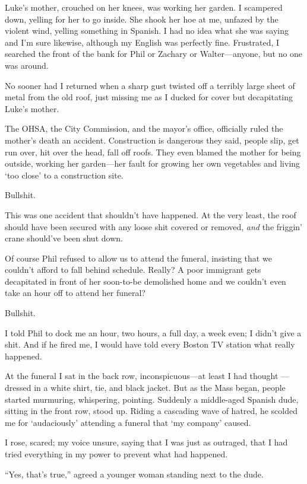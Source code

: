 Luke's mother, crouched on her knees, was working her garden. I
scampered down, yelling for her to go inside. She shook her hoe at me,
unfazed by the violent wind, yelling something in Spanish. I had no idea
what she was saying and I'm sure likewise, although my English was
perfectly fine. Frustrated, I searched the front of the bank for Phil or
Zachary or Walter---anyone, but no one was around.

No sooner had I returned when a sharp gust twisted off a terribly large
sheet of metal from the old roof, just missing me as I ducked for cover
but decapitating Luke's mother.

The OHSA, the City Commission, and the mayor's office, officially ruled
the mother's death an accident. Construction is dangerous they said,
people slip, get run over, hit over the head, fall off roofs. They even
blamed the mother for being outside, working her garden---her fault for
growing her own vegetables and living `too close' to a construction
site.

Bullshit.

This was one accident that shouldn't have happened. At the very least,
the roof should have been secured with any loose shit covered or
removed, \emph{and} the friggin' crane should've been shut down.

Of course Phil refused to allow us to attend the funeral, insisting that
we couldn't afford to fall behind schedule. Really? A poor immigrant
gets decapitated in front of her soon-to-be demolished home and we
couldn't even take an hour off to attend her funeral?

Bullshit.

I told Phil to dock me an hour, two hours, a full day, a week even; I
didn't give a shit. And if he fired me, I would have told every Boston
TV station what really happened.

At the funeral I sat in the back row, inconspicuous---at least I had
thought ---dressed in a white shirt, tie, and black jacket. But as the
Mass began, people started murmuring, whispering, pointing. Suddenly a
middle-aged Spanish dude, sitting in the front row, stood up. Riding a
cascading wave of hatred, he scolded me for `audaciously' attending a
funeral that `my company' caused.

I rose, scared; my voice unsure, saying that I was just as outraged,
that I had tried everything in my power to prevent what had happened.

``Yes, that's true,'' agreed a younger woman standing next to the dude.

